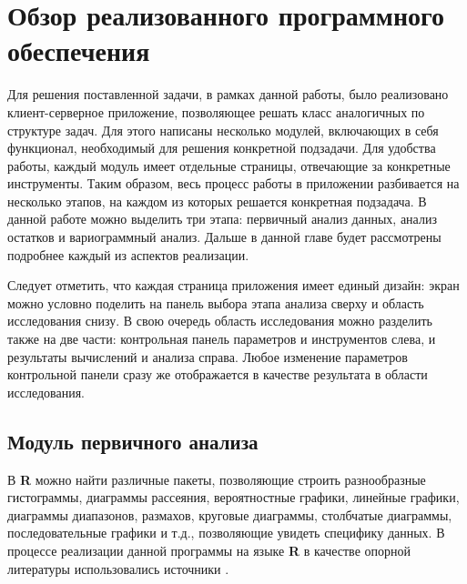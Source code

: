 
\newpage

\chapter{Обзор реализованного программного обеспечения}

Для решения поставленной задачи, в рамках данной работы, было реализовано клиент-серверное приложение, позволяющее решать класс аналогичных по структуре задач. Для этого написаны несколько модулей, включающих в себя функционал, необходимый для решения конкретной подзадачи. Для удобства работы, каждый модуль имеет отдельные страницы, отвечающие за конкретные инструменты. Таким образом, весь процесс работы в приложении разбивается на несколько этапов, на каждом из которых решается конкретная подзадача. В данной работе можно выделить три этапа: первичный анализ данных, анализ остатков и вариограммный анализ. Дальше в данной главе будет рассмотрены подробнее каждый из аспектов реализации.

Следует отметить, что каждая страница приложения имеет единый дизайн: экран можно условно поделить на панель выбора этапа анализа сверху и область исследования снизу. В свою очередь область исследования можно разделить также на две части: контрольная панель параметров и инструментов слева, и результаты вычислений и анализа справа. Любое изменение параметров контрольной панели сразу же отображается в качестве результата в области исследования.

\section{Модуль первичного анализа} %
\label{sec:mod_basis}

В \textbf{R} можно найти различные пакеты, позволяющие строить разнообразные гистограммы, диаграммы рассеяния, вероятностные графики, линейные графики, диаграммы диапазонов, размахов, круговые диаграммы, столбчатые диаграммы, последовательные графики и т.д., позволяющие увидеть специфику данных. В процессе реализации данной программы на языке \textbf{R} в качестве опорной литературы использовались источники \cite{Kabacoff2009R, Teetor2011RCook, Chang2012RGraph}.

